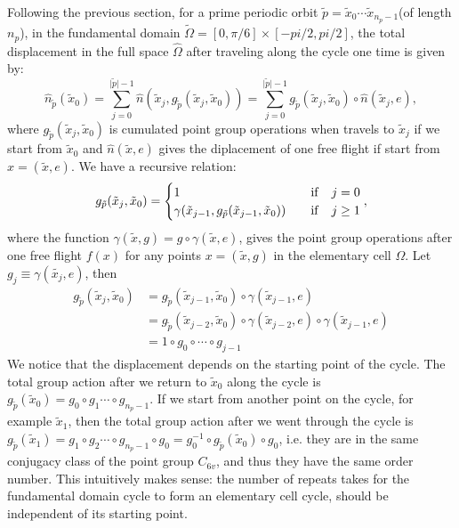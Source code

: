 \begin{description}
Following the previous section, for a prime periodic orbit $\tilde{p}=\tilde{x}_{0}\cdots\tilde{x}_{n_{p}-1}$(of
length $n_{p}$), in the fundamental domain $\tilde{\Omega}=[0,\pi/6]\times[-pi/2,pi/2]$,
the total displacement in the full space $\hat{\Omega}$ after traveling
along the cycle one time is given by:
\[
\hat{n}_{\tilde{p}}(\tilde{x}_{0})=\sum_{j=0}^{\vert\tilde{p}\vert-1}\hat{n}(\tilde{x}_{j},g_{\tilde{p}}(\tilde{x}_{j},\tilde{x}_{0}))=\sum_{j=0}^{\vert\tilde{p}\vert-1}g_{\tilde{p}}(\tilde{x}_{j},\tilde{x}_{0})\circ\hat{n}(\tilde{x}_{j},e),
\]
where $g_{\tilde{p}}(\tilde{x}_{j},\tilde{x}_{0})$ is cumulated point
group operations when travels to $\tilde{x}_{j}$ if we start from
$\tilde{x}_{0}$ and $\hat{n}(\tilde{x},e)$ gives the diplacement
of one free flight if start from$x=(\tilde{x},e)$. We have a recursive
relation:
\[
g_{\tilde{p}}(\tilde{x}_{j},\tilde{x}_{0})=\begin{cases}
1 & {\rm \quad if\quad}j=0\\
\gamma(\tilde{x}_{j-1},g_{\tilde{p}}(\tilde{x}_{j-1},\tilde{x}_{0})) & {\rm \quad if\quad}j\geq1
\end{cases},
\]
where the function $\gamma(\tilde{x},g)=g\circ\gamma(\tilde{x},e)$,
gives the point group operations after one free flight $f(x)$ for
any points $x=(\tilde{x},g)$ in the elementary cell $\Omega$. Let
$g_{j}\equiv\gamma(\tilde{x_{j}},e)$, then 
\begin{align*}
g_{\tilde{p}}(\tilde{x}_{j},\tilde{x}_{0}) & =g_{\tilde{p}}(\tilde{x}_{j-1},\tilde{x}_{0})\circ\gamma(\tilde{x}_{j-1},e)\\
 & =g_{\tilde{p}}(\tilde{x}_{j-2},\tilde{x}_{0})\circ\gamma(\tilde{x}_{j-2},e)\circ\gamma(\tilde{x}_{j-1},e)\\
 & =1\circ g_{0}\circ\cdots\circ g_{j-1}
\end{align*}
We notice that the displacement depends on the starting point of the
cycle. The total group action after we return to $\tilde{x}_{0}$
along the cycle is $g_{\tilde{p}}(\tilde{x}_{0})=g_{0}\circ g_{1}\cdots\circ g_{n_{p}-1}$.
If we start from another point on the cycle, for example $\tilde{x}_{1}$,
then the total group action after we went through the cycle is $g_{\tilde{p}}(\tilde{x}_{1})=g_{1}\circ g_{2}\cdots\circ g_{n_{p}-1}\circ g_{0}=g_{0}^{-1}\circ g_{\tilde{p}}(\tilde{x}_{0})\circ g_{0}$,
i.e. they are in the same conjugacy class of the point group $C_{6v}$,
and thus they have the same order number. This intuitively makes sense:
the number of repeats takes for the fundamental domain cycle to form
an elementary cell cycle, should be independent of its starting point. 


\end{description}
